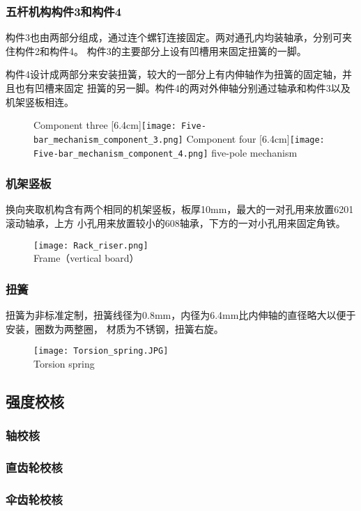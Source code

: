 \subsubsection{五杆机构构件3和构件4}

构件3也由两部分组成，通过连个螺钉连接固定。两对通孔内均装轴承，分别可夹住构件2和构件4。
构件3的主要部分上设有凹槽用来固定扭簧的一脚。

构件4设计成两部分来安装扭簧，较大的一部分上有内伸轴作为扭簧的固定轴，并且也有凹槽来固定
扭簧的另一脚。构件4的两对外伸轴分别通过轴承和构件3以及机架竖板相连。

\begin{figure}[!hbtp]
  \centering
                  {Component three}%
                  [6.4cm]{\texttt{[image: Five-bar\_mechanism\_component\_3.png]}}
  \hspace{1cm}
                  {Component four}%
                  [6.4cm]{\texttt{[image: Five-bar\_mechanism\_component\_4.png]}}
            {five-pole mechanism}
  \label{fig:bisubcaptionbox}
\end{figure}

\subsubsection{机架竖板}

换向夹取机构含有两个相同的机架竖板，板厚10mm，最大的一对孔用来放置6201滚动轴承，上方
小孔用来放置较小的608轴承，下方的一对小孔用来固定角铁。

\begin{figure}[!htp]
  \centering
  \texttt{[image: Rack\_riser.png]} \\
    {Frame（vertical board）}
  \label{fig:机架竖板}
\end{figure}

\subsubsection{扭簧}

扭簧为非标准定制，扭簧线径为0.8mm，内径为6.4mm比内伸轴的直径略大以便于安装，圈数为两整圈，
材质为不锈钢，扭簧右旋。

\begin{figure}[!htp]
  \centering
  \texttt{[image: Torsion\_spring.JPG]} \\
    {Torsion spring}
  \label{fig:扭簧}
\end{figure}

\subsection{强度校核}


\subsubsection{轴校核}
\subsubsection{直齿轮校核}
\subsubsection{伞齿轮校核}